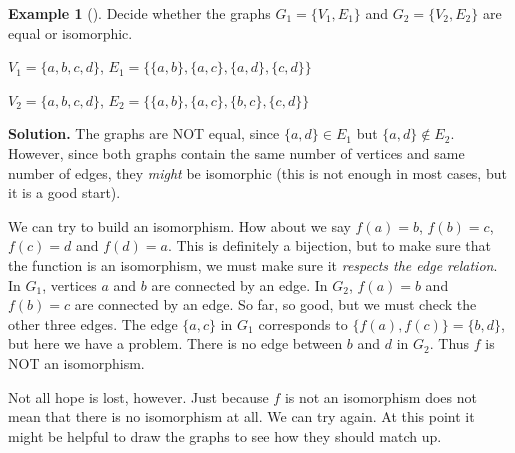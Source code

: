 \documentclass[10pt,]{book}
\theoremstyle{plain}
\theoremstyle{definition}
\theoremstyle{definition}
\newtheorem{example}[theorem]{Example}
\theoremstyle{definition}
\theoremstyle{definition}
\numberwithin{equation}{chapter}
\newlength{\panelmax}
\begin{document}
\begin{example}[]\label{example-77}
\hypertarget{p-1498}{}%
Decide whether the graphs \(G_1 = \{V_1, E_1\}\) and \(G_2 = \{V_2, E_2\}\) are equal or isomorphic.%
\par
\hypertarget{p-1499}{}%
\(V_1 = \{a,b,c,d\}\), \(E_1 = \{\{a,b\}, \{a,c\}, \{a,d\}, \{c,d\}\}\)%
\par
\hypertarget{p-1500}{}%
\(V_2 = \{a,b,c,d\}\), \(E_2 = \{\{a,b\}, \{a,c\}, \{b,c\}, \{c,d\}\}\)%
\par\smallskip%
\noindent\textbf{Solution.}\hypertarget{solution-154}{}\quad%
\hypertarget{p-1501}{}%
The graphs are NOT equal, since \(\{a,d\} \in E_1\) but \(\{a,d\} \notin E_2\). However, since both graphs contain the same number of vertices and same number of edges, they \emph{might} be isomorphic (this is not enough in most cases, but it is a good start).%
\par
\hypertarget{p-1502}{}%
We can try to build an isomorphism. How about we say \(f(a) = b\), \(f(b) = c\), \(f(c) = d\) and \(f(d) = a\). This is definitely a bijection, but to make sure that the function is an isomorphism, we must make sure it \emph{respects the edge relation}. In \(G_1\), vertices \(a\) and \(b\) are connected by an edge. In \(G_2\), \(f(a) = b\) and \(f(b) = c\) are connected by an edge. So far, so good, but we must check the other three edges. The edge \(\{a,c\}\) in \(G_1\) corresponds to \(\{f(a), f(c)\} = \{b,d\}\), but here we have a problem. There is no edge between \(b\) and \(d\) in \(G_2\). Thus \(f\) is NOT an isomorphism.%
\par
\hypertarget{p-1503}{}%
Not all hope is lost, however. Just because \(f\) is not an isomorphism does not mean that there is no isomorphism at all. We can try again. At this point it might be helpful to draw the graphs to see how they should match up.%
{%
\setlength{\panelmax}{0pt}
\ifdefined\panelboxAimage\else\newsavebox{\panelboxAimage}\fi%
\begin{lrbox}{\panelboxAimage}
\end{lrbox}}
\end{example}
\end{document}

